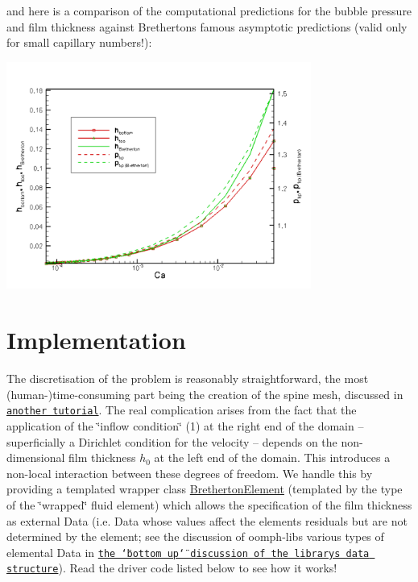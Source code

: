 and here is a comparison of the computational predictions for the bubble pressure and film thickness against Bretherton\textquotesingle{}s famous asymptotic predictions (valid only for small capillary numbers!)\+:

 
\begin{DoxyImage}
\includegraphics[width=0.75\textwidth]{bretherton_trace}
\end{DoxyImage}




 

\hypertarget{index_implement}{}\section{Implementation}\label{index_implement}
The discretisation of the problem is reasonably straightforward, the most (human-\/)time-\/consuming part being the creation of the spine mesh, discussed in \href{../../../navier_stokes/spine_channel/html/index.html}{\tt another tutorial}. The real complication arises from the fact that the application of the \char`\"{}inflow condition\char`\"{} (1) at the right end of the domain -- superficially a Dirichlet condition for the velocity -- depends on the non-\/dimensional film thickness $ h_0 $ at the left end of the domain. This introduces a non-\/local interaction between these degrees of freedom. We handle this by providing a templated wrapper class {\ttfamily \hyperlink{classBrethertonElement}{Bretherton\+Element}} (templated by the type of the \char`\"{}wrapped\char`\"{} fluid element) which allows the specification of the film thickness as external {\ttfamily Data} (i.\+e. {\ttfamily Data} whose values affect the element\textquotesingle{}s residuals but are not determined by the element; see the discussion of {\ttfamily oomph-\/lib\textquotesingle{}s} various types of elemental {\ttfamily Data} in \href{../../../the_data_structure/html/index.html}{\tt the \char`\"{}bottom up\char`\"{} discussion of the library\textquotesingle{}s data structure}). Read the driver code listed below to see how it works!



